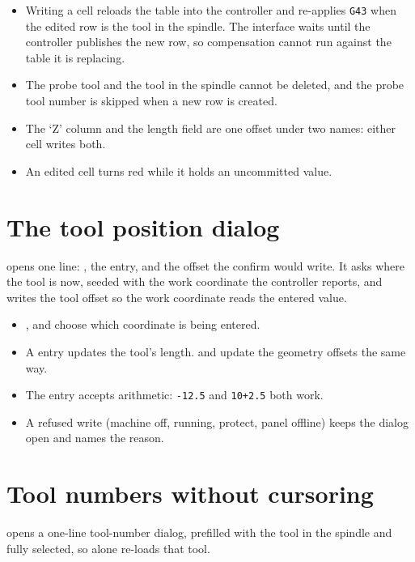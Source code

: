 \begin{itemize}
  \item Writing a cell reloads the table into the controller and re-applies \texttt{G43} when
        the edited row is the tool in the spindle. The interface waits until the controller
        publishes the new row, so compensation cannot run against the table it is replacing.
  \item The probe tool and the tool in the spindle cannot be deleted, and the probe tool
        number is skipped when a new row is created.
  \item The `Z' column and the length field are one offset under two names: either cell writes
        both.
  \item An edited cell turns red while it holds an uncommitted value.
\end{itemize}

\section{The tool position dialog}

 opens one line: , the entry, and the offset the confirm
would write. It asks where the tool is now, seeded with the work coordinate the controller
reports, and writes the tool offset so the work coordinate reads the entered value.

\begin{itemize}
  \item {},  and  choose which coordinate is being entered.
  \item A  entry updates the tool's length.  and  update the
        geometry offsets the same way.
  \item The entry accepts arithmetic: \texttt{-12.5} and \texttt{10+2.5} both work.
  \item A refused write (machine off, running, protect, panel offline) keeps the dialog open
        and names the reason.
\end{itemize}

\section{Tool numbers without cursoring}

 opens a one-line tool-number dialog, prefilled with the tool in the
spindle and fully selected, so  alone re-loads that tool.

